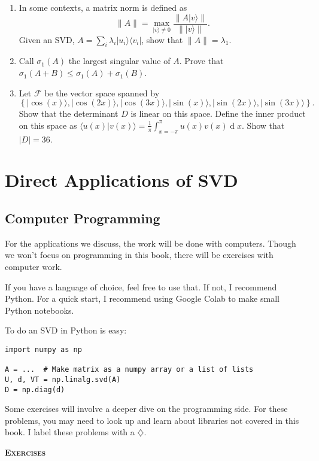 \documentclass{amsbook}
\begin{document}
\begin{enumerate}
\item In some contexts, a matrix norm is defined as 
$$
\|A\|=\max_{|v\rangle\neq0}\frac{\|A|v\rangle\|}{\||v\rangle\|}.
$$
Given an SVD, $A=\sum_i\lambda_i|u_i\rangle\langle v_i|$, show that $\|A\|=\lambda_1$.
\item Call $\sigma_1(A)$ the largest singular value of $A$.  Prove that $\sigma_1(A+B)\leq\sigma_1(A)+\sigma_1(B)$.
\item Let $\mathcal F$ be the vector space spanned by 
$$
\left\{|\cos(x)\rangle, |\cos(2x)\rangle, |\cos(3x)\rangle, |\sin(x)\rangle, |\sin(2x)\rangle, |\sin(3x)\rangle\right\}.
$$
Show that the determinant $D$ is linear on this space.  Define the inner product on this space as $\langle u(x)|v(x)\rangle=\frac{1}{\pi}\int_{x=-\pi}^\pi u(x)v(x)\operatorname{d}x$.  Show that $|D|=36$.
\end{enumerate}

\chapter{Direct Applications of SVD}

\section{Computer Programming}\label{Section-Computer Science}

For the applications we discuss, the work will be done with computers.  Though we won't focus on programming in this book, there will be exercises with computer work.

If you have a language of choice, feel free to use that.  If not, I recommend Python.  For a quick start, I recommend using Google Colab to make small Python notebooks.

To do an SVD in Python is easy:

\begin{lstlisting}
import numpy as np

A = ...  # Make matrix as a numpy array or a list of lists
U, d, VT = np.linalg.svd(A)
D = np.diag(d)
\end{lstlisting}

Some exercises will involve a deeper dive on the programming side.  For these problems, you may need to look up and learn about libraries not covered in this book.  I label these problems with a $\diamondsuit$.

{\bfseries\scshape\Large Exercises}
\end{document}
